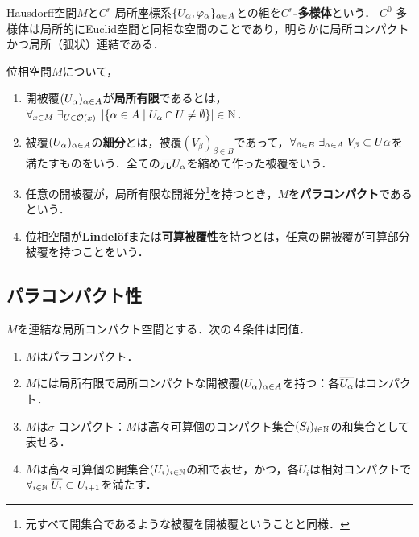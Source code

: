 \documentclass[uplatex,dvipdfmx]{jsreport}
\begin{document}
\begin{definition}[manifold]
    Hausdorff空間$M$と$C^r$-局所座標系$\{U_\alpha,\varphi_\alpha\}_{\alpha\in A}$との組を\textbf{$C^r$-多様体}という．
    $C^0$-多様体は局所的にEuclid空間と同相な空間のことであり，明らかに局所コンパクトかつ局所（弧状）連結である．
\end{definition}

\begin{definition}
    位相空間$M$について，
    \begin{enumerate}
        \item 開被覆$(U_\alpha)_{\alpha\in A}$が\textbf{局所有限}であるとは，$\forall_{x\in M}\;\exists_{U\in\mathcal{O}(x)}\;\left|\left\{\alpha\in A\mid U_\alpha\cap U\ne\emptyset\right\}\right|\in\mathbb{N}$．
        \item 被覆$(U_\alpha)_{\alpha\in A}$の\textbf{細分}とは，被覆$(V_\beta)_{\beta\in B}$であって，$\forall_{\beta\in B}\;\exists_{\alpha\in A}\;V_\beta\subset U\alpha$を満たすものをいう．全ての元$U_\alpha$を縮めて作った被覆をいう．
        \item 任意の開被覆が，局所有限な開細分\footnote{元すべて開集合であるような被覆を開被覆ということと同様．}を持つとき，$M$を\textbf{パラコンパクト}であるという．
        \item 位相空間が\textbf{Lindelöf}または\textbf{可算被覆性}を持つとは，任意の開被覆が可算部分被覆を持つことをいう．
    \end{enumerate}
\end{definition}

\subsection{パラコンパクト性}

\begin{theorem}[局所コンパクト空間のパラコンパクト性の特徴付け]
    $M$を連結な局所コンパクト空間とする．次の４条件は同値．
    \begin{enumerate}
        \item $M$はパラコンパクト．
        \item $M$には局所有限で局所コンパクトな開被覆$(U_\alpha)_{\alpha\in A}$を持つ：各$\overline{U_\alpha}$はコンパクト．
        \item $M$は$\sigma$-コンパクト：$M$は高々可算個のコンパクト集合$(S_i)_{i\in\mathbb{N}}$の和集合として表せる．
        \item $M$は高々可算個の開集合$(U_i)_{i\in\mathbb{N}}$の和で表せ，かつ，各$U_i$は相対コンパクトで$\forall_{i\in\mathbb{N}}\;\overline{U_i}\subset U_{i+1}$を満たす．
    \end{enumerate}
\end{theorem}
\end{document}
